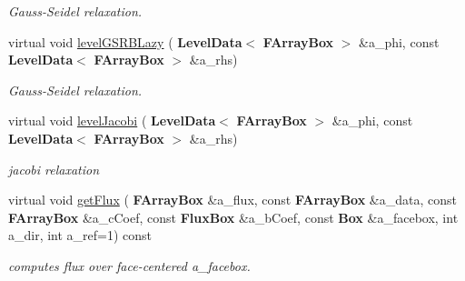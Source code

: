 \begin{DoxyCompactItemize}
\begin{DoxyCompactList}\small\item\em Gauss-\/\+Seidel relaxation. \end{DoxyCompactList}\item 
\mbox{\label{class_darcy_brinkman_op_a6743cea1c7637481cc5a40fc7431aece}} 
virtual void \hyperlink{class_darcy_brinkman_op_a6743cea1c7637481cc5a40fc7431aece}{level\+G\+S\+R\+B\+Lazy} (\textbf{ Level\+Data}$<$ \textbf{ F\+Array\+Box} $>$ \&a\+\_\+phi, const \textbf{ Level\+Data}$<$ \textbf{ F\+Array\+Box} $>$ \&a\+\_\+rhs)
\begin{DoxyCompactList}\small\item\em Gauss-\/\+Seidel relaxation. \end{DoxyCompactList}\item 
\mbox{\label{class_darcy_brinkman_op_a9ad6b182c9779e420fef314ace1438ae}} 
virtual void \hyperlink{class_darcy_brinkman_op_a9ad6b182c9779e420fef314ace1438ae}{level\+Jacobi} (\textbf{ Level\+Data}$<$ \textbf{ F\+Array\+Box} $>$ \&a\+\_\+phi, const \textbf{ Level\+Data}$<$ \textbf{ F\+Array\+Box} $>$ \&a\+\_\+rhs)
\begin{DoxyCompactList}\small\item\em jacobi relaxation \end{DoxyCompactList}\item 
\mbox{\label{class_darcy_brinkman_op_ad0f0d56e1038701d7442298e586e4fe5}} 
virtual void \hyperlink{class_darcy_brinkman_op_ad0f0d56e1038701d7442298e586e4fe5}{get\+Flux} (\textbf{ F\+Array\+Box} \&a\+\_\+flux, const \textbf{ F\+Array\+Box} \&a\+\_\+data, const \textbf{ F\+Array\+Box} \&a\+\_\+c\+Coef, const \textbf{ Flux\+Box} \&a\+\_\+b\+Coef, const \textbf{ Box} \&a\+\_\+facebox, int a\+\_\+dir, int a\+\_\+ref=1) const
\begin{DoxyCompactList}\small\item\em computes flux over face-\/centered a\+\_\+facebox. \end{DoxyCompactList}\end{DoxyCompactItemize}
